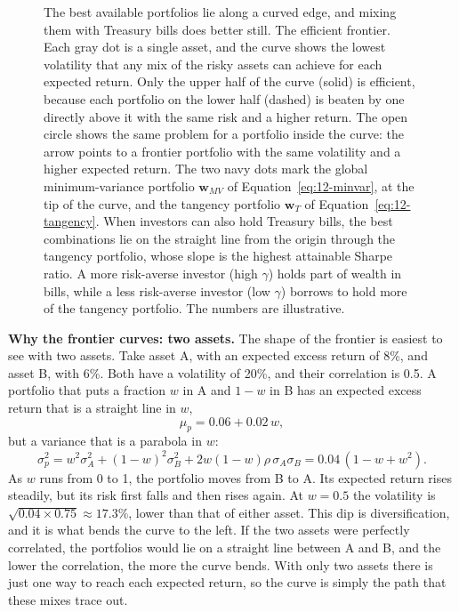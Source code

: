 \begin{figure}[htbp]
{%
}
\caption{The best available portfolios lie along a curved edge, and mixing them with Treasury bills does better still. The efficient frontier. Each gray dot is a single asset, and the curve shows the lowest volatility that any mix of the risky assets can achieve for each expected return. Only the upper half of the curve (solid) is efficient, because each portfolio on the lower half (dashed) is beaten by one directly above it with the same risk and a higher return. The open circle shows the same problem for a portfolio inside the curve: the arrow points to a frontier portfolio with the same volatility and a higher expected return. The two navy dots mark the global minimum-variance portfolio $\mathbf{w}_{MV}$ of Equation~\eqref{eq:12-minvar}, at the tip of the curve, and the tangency portfolio $\mathbf{w}_T$ of Equation~\eqref{eq:12-tangency}. When investors can also hold Treasury bills, the best combinations lie on the straight line from the origin through the tangency portfolio, whose slope is the highest attainable Sharpe ratio. A more risk-averse investor (high $\gamma$) holds part of wealth in bills, while a less risk-averse investor (low $\gamma$) borrows to hold more of the tangency portfolio. The numbers are illustrative.}
\label{fig:12-frontier}
\end{figure}

\textbf{Why the frontier curves: two assets.}\label{sec:12-frontier-derivation} The shape of the frontier is easiest to see with two assets. Take asset A, with an expected excess return of 8\%, and asset B, with 6\%. Both have a volatility of 20\%, and their correlation is 0.5. A portfolio that puts a fraction $w$ in A and $1 - w$ in B has an expected excess return that is a straight line in $w$,
\begin{equation}
  \mu_p = 0.06 + 0.02\,w,
  \label{eq:12-two-mean}
\end{equation}
but a variance that is a parabola in $w$:
\begin{equation}
  \sigma_p^2 = w^2\sigma_A^2 + (1-w)^2\sigma_B^2 + 2w(1-w)\rho\,\sigma_A\sigma_B = 0.04\,(1 - w + w^2).
  \label{eq:12-two-var}
\end{equation}
As $w$ runs from 0 to 1, the portfolio moves from B to A. Its expected return rises steadily, but its risk first falls and then rises again. At $w = 0.5$ the volatility is $\sqrt{0.04 \times 0.75} \approx 17.3\%$, lower than that of either asset. This dip is diversification, and it is what bends the curve to the left. If the two assets were perfectly correlated, the portfolios would lie on a straight line between A and B, and the lower the correlation, the more the curve bends. With only two assets there is just one way to reach each expected return, so the curve is simply the path that these mixes trace out.

